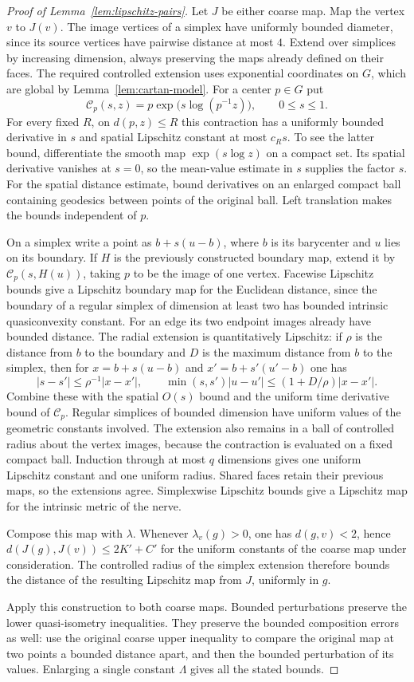 \begin{proof}[Proof of Lemma~\ref{lem:lipschitz-pairs}]
Let $J$ be either coarse map.  Map the vertex $v$ to $J(v)$.
The image vertices of a simplex have uniformly bounded diameter, since
its source vertices have pairwise distance at most $4$.
Extend over simplices by increasing dimension, always preserving the
maps already defined on their faces.  The required controlled extension
uses exponential coordinates on $G$, which are global by
Lemma~\ref{lem:cartan-model}.  For a center $p\in G$ put
\[
 \mathcal C_p(s,z)=p\exp\bigl(s\log(p^{-1}z)\bigr),
 \qquad 0\le s\le1.
\]
For every fixed $R$, on $d(p,z)\le R$ this contraction has a uniformly
bounded derivative in $s$ and spatial Lipschitz constant at most
$c_Rs$.  To see the latter bound, differentiate the smooth map
$\exp(s\log z)$ on a compact set.  Its spatial derivative vanishes at
$s=0$, so the mean-value estimate in $s$ supplies the factor $s$.
For the spatial distance estimate, bound derivatives on an enlarged
compact ball containing geodesics between points of the original ball.
Left translation makes the bounds independent of $p$.

On a simplex write a point as $b+s(u-b)$, where $b$ is its barycenter
and $u$ lies on its boundary.  If $H$ is the previously constructed
boundary map, extend it by $\mathcal C_p(s,H(u))$, taking $p$ to be
the image of one vertex.  Facewise Lipschitz bounds give a Lipschitz
boundary map for the Euclidean distance, since the boundary of a
regular simplex of dimension at least two has bounded intrinsic
quasiconvexity constant.  For an edge its two endpoint images already
have bounded distance.  The radial extension is quantitatively
Lipschitz: if $\rho$ is the distance from $b$ to the boundary and
$D$ is the maximum distance from $b$ to the simplex, then for
$x=b+s(u-b)$ and $x'=b+s'(u'-b)$ one has
\[
 |s-s'|\le \rho^{-1}|x-x'|,\qquad
 \min(s,s')|u-u'|\le (1+D/\rho)|x-x'|.
\]
Combine these with the spatial $O(s)$ bound and the uniform time
derivative bound of $\mathcal C_p$.  Regular simplices of bounded
dimension have uniform values of the geometric constants involved.
The extension also remains in a ball of controlled radius about the
vertex images, because the contraction is evaluated on a fixed compact
ball.
Induction through at most $q$ dimensions gives one uniform Lipschitz
constant and one uniform radius.  Shared faces retain their previous
maps, so the extensions agree.  Simplexwise Lipschitz bounds give a
Lipschitz map for the intrinsic metric of the nerve.

Compose this map with $\lambda$.  Whenever $\lambda_v(g)>0$, one has
$d(g,v)<2$, hence $d(J(g),J(v))\le 2K'+C'$ for the uniform constants
of the coarse map under consideration.  The controlled radius of the
simplex extension therefore bounds the distance of the resulting
Lipschitz map from $J$, uniformly in $g$.

Apply this construction to both coarse maps.  Bounded perturbations
preserve the lower quasi-isometry inequalities.  They preserve the
bounded composition errors as well: use the original coarse upper
inequality to compare the original map at two points a bounded distance
apart, and then the bounded perturbation of its values.  Enlarging a
single constant $\Lambda$ gives all the stated bounds.
\end{proof}
